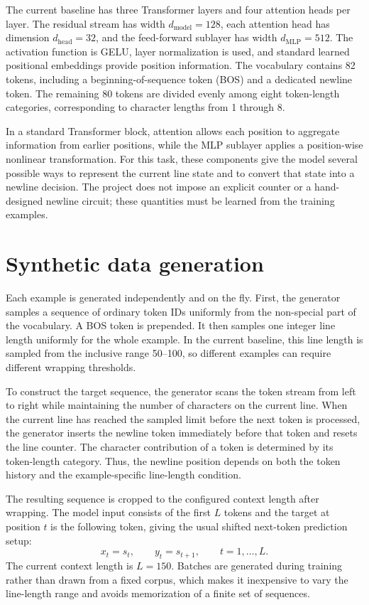 \documentclass[11pt]{article}
\begin{document}
The current baseline has three Transformer layers and four attention heads per
layer.  The residual stream has width $d_{\mathrm{model}}=128$, each attention
head has dimension $d_{\mathrm{head}}=32$, and the feed-forward sublayer has
width $d_{\mathrm{MLP}}=512$.  The activation function is GELU, layer
normalization is used, and standard learned positional embeddings provide
position information.  The vocabulary contains 82 tokens, including a
beginning-of-sequence token (BOS) and a dedicated newline token.  The remaining
80 tokens are divided evenly among eight token-length categories, corresponding
to character lengths from 1 through 8.

In a standard Transformer block, attention allows each position to aggregate
information from earlier positions, while the MLP sublayer applies a
position-wise nonlinear transformation.  For this task, these components give
the model several possible ways to represent the current line state and to
convert that state into a newline decision.  The project does not impose an
explicit counter or a hand-designed newline circuit; these quantities must be
learned from the training examples.

\section{Synthetic data generation}

Each example is generated independently and on the fly.  First, the generator
samples a sequence of ordinary token IDs uniformly from the non-special part
of the vocabulary.  A BOS token is prepended.  It then samples one integer line
length uniformly for the whole example.  In the current baseline, this line
length is sampled from the inclusive range 50--100, so different examples can
require different wrapping thresholds.

To construct the target sequence, the generator scans the token stream from
left to right while maintaining the number of characters on the current line.
When the current line has reached the sampled limit before the next token is
processed, the generator inserts the newline token immediately before that
token and resets the line counter.  The character contribution of a token is
determined by its token-length category.  Thus, the newline position depends on
both the token history and the example-specific line-length condition.

The resulting sequence is cropped to the configured context length after
wrapping.  The model input consists of the first $L$ tokens and the target at
position $t$ is the following token, giving the usual shifted next-token
prediction setup:
\[
    x_t = s_t, \qquad y_t = s_{t+1}, \qquad t=1,\ldots,L.
\]
The current context length is $L=150$.  Batches are generated during training
rather than drawn from a fixed corpus, which makes it inexpensive to vary the
line-length range and avoids memorization of a finite set of sequences.
\end{document}
